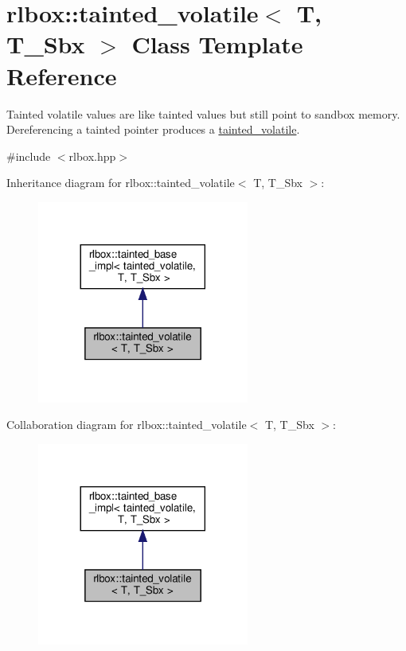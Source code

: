 \hypertarget{classrlbox_1_1tainted__volatile}{}\section{rlbox\+:\+:tainted\+\_\+volatile$<$ T, T\+\_\+\+Sbx $>$ Class Template Reference}
\label{classrlbox_1_1tainted__volatile}


Tainted volatile values are like tainted values but still point to sandbox memory. Dereferencing a tainted pointer produces a \hyperlink{classrlbox_1_1tainted__volatile}{tainted\+\_\+volatile}.  




{\ttfamily \#include $<$rlbox.\+hpp$>$}



Inheritance diagram for rlbox\+:\+:tainted\+\_\+volatile$<$ T, T\+\_\+\+Sbx $>$\+:\nopagebreak
\begin{figure}[H]
\begin{center}
\leavevmode
\includegraphics[width=197pt]{classrlbox_1_1tainted__volatile__inherit__graph}
\end{center}
\end{figure}


Collaboration diagram for rlbox\+:\+:tainted\+\_\+volatile$<$ T, T\+\_\+\+Sbx $>$\+:\nopagebreak
\begin{figure}[H]
\begin{center}
\leavevmode
\includegraphics[width=197pt]{classrlbox_1_1tainted__volatile__coll__graph}
\end{center}
\end{figure}
